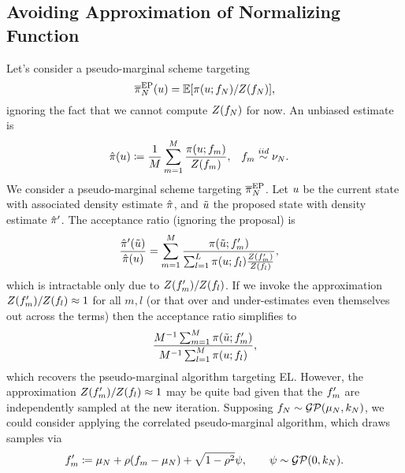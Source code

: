 \documentclass[12pt]{article}
\begin{document}
\subsection{Avoiding Approximation of Normalizing Function}
Let's consider a pseudo-marginal scheme targeting 
\begin{equation}
\overline{\pi}_{N}^{\mathrm{EP}}(u) = \mathbb{E}[\pi(u; f_{N})/Z(f_{N})],
\end{equation}
ignoring the fact that we cannot compute $Z(f_{N})$ for now. An unbiased estimate
is
\begin{align}
&\hat{\pi}(u) \coloneqq \frac{1}{M} \sum_{m=1}^{M} \frac{\pi(u; f_m)}{Z(f_m)},
&&f_m \overset{iid}{\sim} \nu_{N}.
\end{align}
We consider a pseudo-marginal scheme targeting $\overline{\pi}_{N}^{\mathrm{EP}}$. Let $u$ be the current state with associated
density estimate $\hat{\pi}$, and $\tilde{u}$ the proposed state with density estimate
$\hat{\pi}^\prime$. The acceptance ratio (ignoring the proposal) is 
\begin{align}
\frac{\hat{\pi}^\prime(\tilde{u})}{\hat{\pi}(u)}
&= \sum_{m=1}^{M} \frac{\pi(\tilde{u}; f_m^\prime)}{\sum_{l=1}^{L} \pi(u; f_l) 
\frac{Z(f_m^\prime)}{Z(f_l)}},
\end{align}
which is intractable only due to $Z(f_m^\prime)/Z(f_l)$. If we invoke the approximation
$Z(f_m^\prime)/Z(f_l) \approx 1$ for all $m,l$ (or that over and under-estimates even 
themselves out across the terms) then the acceptance ratio simplifies to
\begin{equation}
\frac{M^{-1} \sum_{m=1}^{M} \pi(\tilde{u}; f_m^\prime)}{M^{-1} \sum_{l=1}^{M} \pi(u; f_l)},
\end{equation}
which recovers the pseudo-marginal algorithm targeting EL. However, the approximation
$Z(f_m^\prime)/Z(f_l) \approx 1$ may be quite bad given that the $f^\prime_m$
are independently sampled at the new iteration. Supposing $f_{N} \sim \mathcal{GP}(\mu_{N}, k_{N})$, we could consider applying the 
correlated pseudo-marginal algorithm, which draws samples via
\begin{align}
f^\prime_m \coloneqq \mu_{N} + \rho (f_m  - \mu_{N}) + \sqrt{1 - \rho^2} \psi, \qquad \psi \sim \mathcal{GP}(0, k_{N}).
\end{align}
\end{document}
